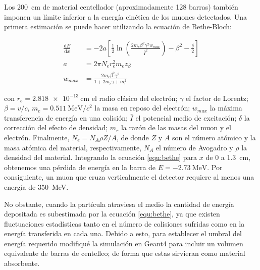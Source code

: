 Los \SI{200}{\cm} de material centellador (aproximadamente \num{128} barras) también imponen un límite inferior a la energía cinética de los muones detectados. Una primera estimación se puede hacer utilizando la ecuación de Bethe-Bloch:

\begin{align}
\label{equ:bethe}
\frac{\mathrm{d}E}{\mathrm{d}x} &=-2a\left[\frac{1}{2}\ln\left(\frac{2m_{e}\beta^{2}\gamma^{2}w_{max}}{\bar{I}^{2}}\right)-\beta^{2}-\frac{\delta}{2}\right] \\
a &=2\pi N_{e}r_{e}^{2}m_{e}z_{\beta}  \nonumber \\
w_{max} &=\frac{2m_{e}\beta^{2}\gamma^{2}}{1+2m_{r}\gamma+m_{r}^{2}} \nonumber
\end{align}

con $r_{e}=\SI{2.818e-13}{\cm}$ el radio clásico del electrón; $\gamma$ el factor de Lorentz; $\beta=v/c$, $m_{e}=\SI{0.511}{\mega\electronvolt\per c^{2}}$ la masa en reposo del electrón; $w_{max}$ la máxima transferencia de energía en una colisión; $\bar{I}$ el potencial medio de excitación; $\delta$ la corrección del efecto de densidad; $m_{r}$ la razón de las masas del muon y el electrón. Finalmente, $N_{e}=N_{A}\rho Z/A$, de donde $Z$ y $A$ son el número atómico y la masa atómica del material, respectivamente, $N_{A}$ el número de Avogadro y $\rho$ la densidad del material. Integrando la ecuación \ref{equ:bethe} para $x$ de \num{0} a \SI{1.3}{\cm}, obtenemos una pérdida de energía en la barra de $E=\SI{-2.73}{\mega\electronvolt}$. Por consiguiente, un muon que cruza verticalmente el detector requiere al menos una energía de \SI{350}{\mega\electronvolt}.

No obstante, cuando la partícula atraviesa el medio la cantidad de energía depositada es subestimada por la ecuación \ref{equ:bethe}, ya que existen fluctuaciones estadísticas tanto en el número de colisiones sufridas como en la energía transferida en cada una. Debido a esto, para establecer el umbral del energía requerido modifiqué la simulación en Geant4 para incluir un volumen equivalente de barras de centelleo; de forma que estas sirvieran como material absorbente.

